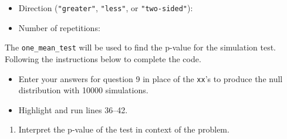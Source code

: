 \documentclass[
]{report}
\newenvironment{Shaded}{\begin{snugshade}}{\end{snugshade}}
\newcommand{\AttributeTok}[1]{\textcolor[rgb]{0.13,0.29,0.53}{#1}}
\newcommand{\CommentTok}[1]{\textcolor[rgb]{0.56,0.35,0.01}{\textit{#1}}}
\newcommand{\DecValTok}[1]{\textcolor[rgb]{0.00,0.00,0.81}{#1}}
\newcommand{\FunctionTok}[1]{\textcolor[rgb]{0.13,0.29,0.53}{\textbf{#1}}}
\newcommand{\NormalTok}[1]{#1}
\newcommand{\SpecialCharTok}[1]{\textcolor[rgb]{0.81,0.36,0.00}{\textbf{#1}}}
\newcommand{\StringTok}[1]{\textcolor[rgb]{0.31,0.60,0.02}{#1}}
\providecommand{\tightlist}{%
  \setlength{\itemsep}{0pt}\setlength{\parskip}{0pt}}
\begin{document}
\vspace{.15in}

\begin{itemize}
\tightlist
\item
  Direction (\texttt{"greater"}, \texttt{"less"}, or \texttt{"two-sided"}):
\end{itemize}

\vspace{.15in}

\begin{itemize}
\tightlist
\item
  Number of repetitions:
\end{itemize}

\vspace{.15in}

\newpage

The \texttt{one\_mean\_test} will be used to find the p-value for the simulation test. Following the instructions below to complete the code.

\begin{itemize}
\item
  Enter your answers for question 9 in place of the \texttt{xx}'s to produce the null distribution with 10000 simulations.
\item
  Highlight and run lines 36--42.
\end{itemize}

\begin{Shaded}
\end{Shaded}

\begin{enumerate}
\def\labelenumi{\arabic{enumi}.}
\setcounter{enumi}{9}
\tightlist
\item
  Interpret the p-value of the test in context of the problem.
\end{enumerate}
\end{document}
